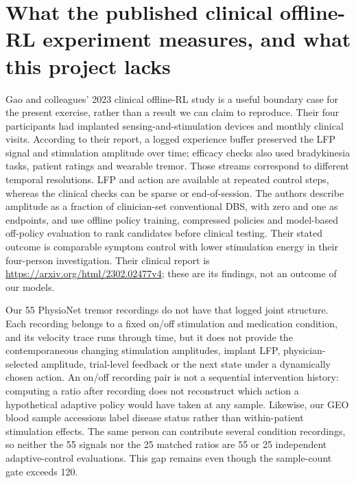 \section{What the published clinical offline-RL experiment measures, and what this project lacks}
Gao and colleagues' 2023 clinical offline-RL study is a useful boundary case for the present exercise, rather than a result we can claim to reproduce. Their four participants had implanted sensing-and-stimulation devices and monthly clinical visits. According to their report, a logged experience buffer preserved the LFP signal and stimulation amplitude over time; efficacy checks also used bradykinesia tasks, patient ratings and wearable tremor. Those streams correspond to different temporal resolutions. LFP and action are available at repeated control steps, whereas the clinical checks can be sparse or end-of-session. The authors describe amplitude as a fraction of clinician-set conventional DBS, with zero and one as endpoints, and use offline policy training, compressed policies and model-based off-policy evaluation to rank candidates before clinical testing. Their stated outcome is comparable symptom control with lower stimulation energy in their four-person investigation. Their clinical report is \url{https://arxiv.org/html/2302.02477v4}; these are its findings, not an outcome of our models.

Our 55 PhysioNet tremor recordings do not have that logged joint structure. Each recording belongs to a fixed on/off stimulation and medication condition, and its velocity trace runs through time, but it does not provide the contemporaneous changing stimulation amplitudes, implant LFP, physician-selected amplitude, trial-level feedback or the next state under a dynamically chosen action. An on/off recording pair is not a sequential intervention history: computing a ratio after recording does not reconstruct which action a hypothetical adaptive policy would have taken at any sample. Likewise, our GEO blood sample accessions label disease status rather than within-patient stimulation effects. The same person can contribute several condition recordings, so neither the 55 signals nor the 25 matched ratios are 55 or 25 independent adaptive-control evaluations. This gap remains even though the sample-count gate exceeds 120.

